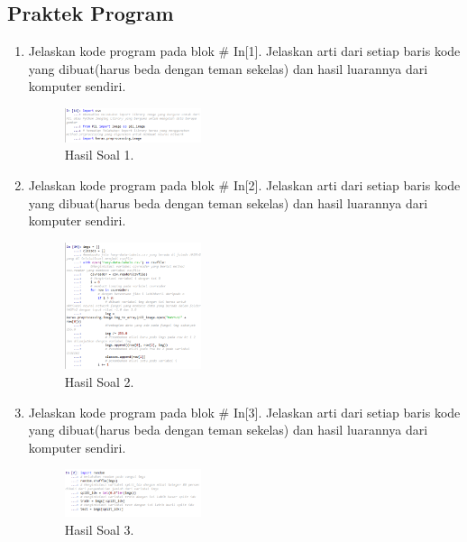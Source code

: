 \subsection{Praktek Program}
\begin{enumerate}
	\item  Jelaskan kode program pada blok \# In[1]. Jelaskan arti dari setiap baris kode yang dibuat(harus beda dengan teman sekelas) dan hasil luarannya dari komputer sendiri.
	\hfill\break
	
	\begin{figure}[H]
	\centering
		\includegraphics[width=4cm]{figures/1174096/tugas7/praktek_1.PNG}
		\caption{Hasil Soal 1.}
	\end{figure}

	\item  Jelaskan kode program pada blok \# In[2]. Jelaskan arti dari setiap baris kode yang dibuat(harus beda dengan teman sekelas) dan hasil luarannya dari komputer sendiri.
	\hfill\break
	
	\begin{figure}[H]
	\centering
		\includegraphics[width=4cm]{figures/1174096/tugas7/praktek_2.PNG}
		\caption{Hasil Soal 2.}
	\end{figure}

	\item Jelaskan kode program pada blok \# In[3]. Jelaskan arti dari setiap baris kode yang dibuat(harus beda dengan teman sekelas) dan hasil luarannya dari komputer sendiri.
	\hfill\break
	
	\begin{figure}[H]
	\centering
		\includegraphics[width=4cm]{figures/1174096/tugas7/praktek_3.PNG}
		\caption{Hasil Soal 3.}
	\end{figure}


\end{enumerate}
